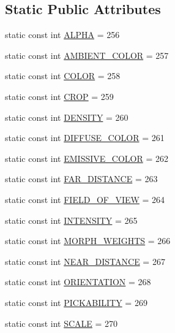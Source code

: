 \subsection*{Static Public Attributes}
\begin{CompactItemize}
\item 
static const int \hyperlink{classm3g_1_1AnimationTrack_417581fcde4067111f47320edb2aa378}{ALPHA} = 256
\item 
static const int \hyperlink{classm3g_1_1AnimationTrack_71b6e9c23b95f8011da4565f4a12f677}{AMBIENT\_\-COLOR} = 257
\item 
static const int \hyperlink{classm3g_1_1AnimationTrack_a6d8034c897057de595a4511a4e7a837}{COLOR} = 258
\item 
static const int \hyperlink{classm3g_1_1AnimationTrack_91fa562078e577c24d06faf8391b34fe}{CROP} = 259
\item 
static const int \hyperlink{classm3g_1_1AnimationTrack_7d0fe4463930d4a4b24fc47660561899}{DENSITY} = 260
\item 
static const int \hyperlink{classm3g_1_1AnimationTrack_9631242a611cf95d697c25064dba7c4f}{DIFFUSE\_\-COLOR} = 261
\item 
static const int \hyperlink{classm3g_1_1AnimationTrack_893461d45d084e5db05b159068f945d0}{EMISSIVE\_\-COLOR} = 262
\item 
static const int \hyperlink{classm3g_1_1AnimationTrack_86457ec0a2799f1f2d7ea8173a644de8}{FAR\_\-DISTANCE} = 263
\item 
static const int \hyperlink{classm3g_1_1AnimationTrack_94c1c1d2f7d48b52e3c2bcd332ed3937}{FIELD\_\-OF\_\-VIEW} = 264
\item 
static const int \hyperlink{classm3g_1_1AnimationTrack_369fe8830f39fe4aec819a371a6c9904}{INTENSITY} = 265
\item 
static const int \hyperlink{classm3g_1_1AnimationTrack_d75f3e3033e268d0a74f9533cfa9b9d6}{MORPH\_\-WEIGHTS} = 266
\item 
static const int \hyperlink{classm3g_1_1AnimationTrack_74f49e3b52778aff378dac012e59cdb2}{NEAR\_\-DISTANCE} = 267
\item 
static const int \hyperlink{classm3g_1_1AnimationTrack_c7fe423a6a639520b0b3d1c1e663784b}{ORIENTATION} = 268
\item 
static const int \hyperlink{classm3g_1_1AnimationTrack_87fcd8136941a05a8a95c61e499692e0}{PICKABILITY} = 269
\item 
static const int \hyperlink{classm3g_1_1AnimationTrack_8334f0c0c56b96debb10231b86050ead}{SCALE} = 270
\item 

\end{CompactItemize}
